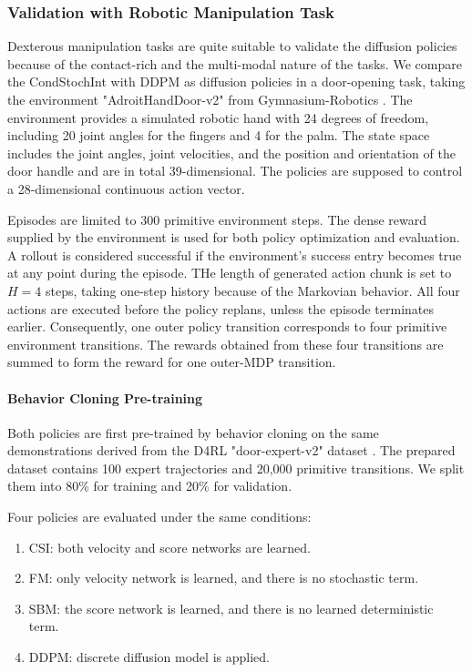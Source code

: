 \subsubsection{Validation with Robotic Manipulation Task}
Dexterous manipulation tasks are quite suitable to validate the diffusion policies because of the contact-rich and the multi-modal nature of the tasks. We compare the CondStochInt with \ac{DDPM} as diffusion policies in a door-opening task, taking the environment "AdroitHandDoor-v2" from Gymnasium-Robotics \citep{gymnasium_robotics2023github, rajeswaran2018learning}. The environment provides a simulated robotic hand with 24 degrees of freedom, including 20 joint angles for the fingers and 4 for the palm. The state space includes the joint angles, joint velocities, and the position and orientation of the door handle and are in total 39-dimensional. The policies are supposed to control a 28-dimensional continuous action vector. 

Episodes are limited to 300 primitive environment steps. The dense reward supplied by the environment is used for both policy optimization and evaluation. A rollout is considered successful if the environment’s success entry becomes true at any point during the episode. THe length of generated action chunk is set to $H=4$ steps, taking one-step history because of the Markovian behavior. All four actions are executed before the policy replans, unless the episode terminates earlier. Consequently, one outer policy transition  corresponds to four primitive environment transitions. The rewards obtained from these four transitions are summed to form the reward for one outer-MDP transition.

\paragraph{Behavior Cloning Pre-training}
Both policies are first pre-trained by behavior cloning on the same demonstrations derived from the D4RL "door-expert-v2" dataset \citep{fu2020d4rl}. The prepared dataset contains 100 expert trajectories and 20,000 primitive transitions. We split them into 80\% for training and 20\% for validation. 

Four policies are evaluated under the same conditions: 
\begin{enumerate}
    \item CSI: both velocity and score networks are learned.
    \item FM: only velocity network is learned, and there is no stochastic term.
    \item SBM: the score network is learned, and there is no learned deterministic term.
    \item DDPM: discrete diffusion model is applied.
\end{enumerate}

